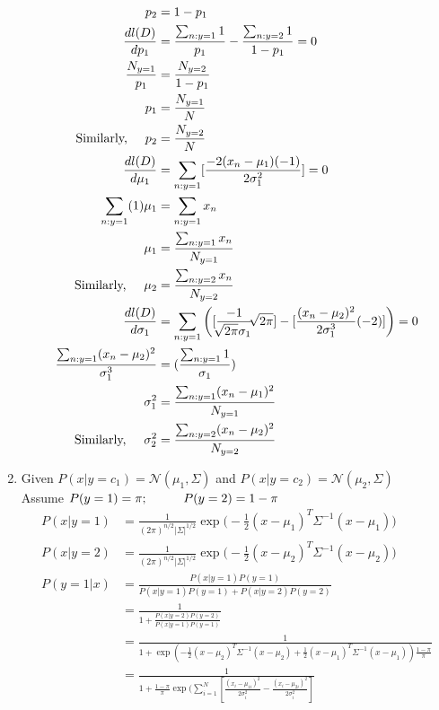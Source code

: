 \documentclass[12pt]{article}
\begin{document}
\begin{enumerate}[label=\alph*.]
\begin{align}
p_2 &= 1 - p_1\\
\frac{d l(D)}{dp_1} &= \frac{\sum_{n:y=1}1}{p_1} - \frac{\sum_{n:y=2}1}{1 - p_1} = 0\\
\frac{N_{y=1}}{p_1} &= \frac{N_{y=2}}{1 - p_1}\\
p_1 &= \frac{N_{y=1}}{N}\\
\textrm{Similarly,}\hspace{5mm} p_2 &= \frac{N_{y=2}}{N}\\
\frac{d l(D)}{d\mu_1} &= \sum_{n:y=1}[\frac{-2(x_n-\mu_1)(-1)}{2\sigma_1^2}] = 0\\
\sum_{n:y=1}(1)\mu_1 &= \sum_{n:y=1}x_n \\
\mu_1 &= \frac{\sum_{n:y=1}x_n}{N_{y=1}}\\
\textrm{Similarly,}\hspace{5mm} \mu_2 &= \frac{\sum_{n:y=2}x_n}{N_{y=2}}\\
\frac{d l(D)}{d\sigma_1} &= \sum_{n:y=1}\bigg([\frac{-1}{\sqrt[]{2\pi}\sigma_1}\sqrt[]{2\pi} ] - [\frac{(x_n-\mu_2)^2}{2\sigma_1^3}(-2)]\bigg)=0\\
\frac{\sum_{n:y=1}(x_n-\mu_2)^2}{\sigma_1^3} &= (\frac{\sum_{n:y=1}1}{\sigma_1})\\
\sigma_1^2 &= \frac{\sum_{n:y=1}(x_n-\mu_1)^2}{N_{y=1}}\\
\textrm{Similarly,}\hspace{5mm}\sigma_2^2 &= \frac{\sum_{n:y=2}(x_n-\mu_2)^2}{N_{y=2}}
\end{align}
\newpage
\item
Given 
$P(x|y=c_1) = \mathcal{N}(\mu_1,\Sigma)$ and
$P(x|y=c_2) = \mathcal{N}(\mu_2,\Sigma)$\\
Assume $ P(y=1) = \pi; \hspace{10mm} P(y=2) = 1-\pi  $
\begin{align}
P(x|y=1) &= \frac{1}{(2\pi)^{n/2}|\Sigma|^{1/2}} \exp \bigg(-\frac{1}{2}(x-\mu_1)^T\Sigma^{-1}(x-\mu_1) \bigg)\\
P(x|y=2) &= \frac{1}{(2\pi)^{n/2}|\Sigma|^{1/2}} \exp \bigg(-\frac{1}{2}(x-\mu_2)^T\Sigma^{-1}(x-\mu_2) \bigg)\\
P(y=1|x) &= \frac{P(x|y=1) P(y=1)}{P(x|y=1) P(y=1)+ P(x|y=2) P(y=2)} \\
&=\frac{1}{1+\frac{P(x|y=2) P(y=2)}{P(x|y=1) P(y=1)}}\\
& = \frac{1}{1 + \exp (-\frac{1}{2}(x-\mu_2)^T\Sigma^{-1}(x-\mu_2)  + \frac{1}{2}(x-\mu_1)^T\Sigma^{-1}(x-\mu_1) ) \frac{1-\pi}{\pi}}\\
& =  \frac{1}{1 + \frac{1-\pi}{\pi} \exp(\sum_{i=1}^N [\frac{(x_i-\mu_{1i})^2}{2\sigma_i^2} - \frac{(x_i-\mu_{2i})^2}{2\sigma_i^2}] } \\

\end{align}
\end{enumerate}
\end{document}
